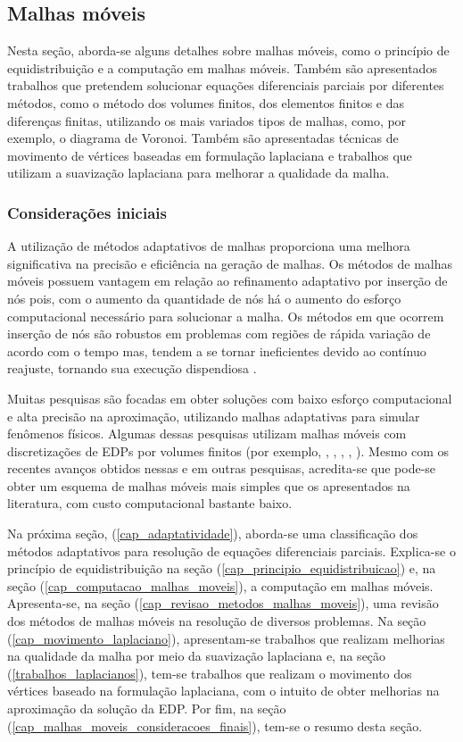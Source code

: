 \subsection{Malhas móveis}
\label{cap_malhas_moveis}
Nesta seção, aborda-se alguns detalhes sobre malhas móveis, como o princípio de equidistribuição e a computação em malhas móveis. Também são apresentados trabalhos que pretendem solucionar equações diferenciais parciais por diferentes métodos, como o método dos volumes finitos, dos elementos finitos e das diferenças finitas, utilizando os mais variados tipos de malhas, como, por exemplo, o diagrama de Voronoi. Também são apresentadas técnicas de movimento de vértices baseadas em formulação laplaciana e trabalhos que utilizam a suavização laplaciana para melhorar a qualidade da malha.

\subsubsection{Considerações iniciais}

A utilização de métodos adaptativos de malhas proporciona uma melhora significativa na precisão e eficiência na geração de malhas. Os métodos de malhas móveis possuem vantagem em relação ao refinamento adaptativo por inserção de nós pois, com o aumento da quantidade de nós há o aumento do esforço computacional necessário para solucionar a malha. Os métodos em que ocorrem inserção de nós são robustos em problemas com regiões de rápida variação de acordo com o tempo mas, tendem a se tornar ineficientes devido ao contínuo reajuste, tornando sua execução dispendiosa \cite[p. 709]{Huang1994A}. 

Muitas pesquisas são focadas em obter soluções com baixo esforço computacional e alta precisão na aproximação, utilizando malhas adaptativas para simular fenômenos físicos. Algumas dessas pesquisas utilizam malhas móveis com discretizações de EDPs por volumes finitos (por exemplo, , , , , ). Mesmo com os recentes avanços obtidos nessas e em outras pesquisas, acredita-se que pode-se obter um esquema de malhas móveis mais simples que os apresentados na literatura, com custo computacional bastante baixo.

Na próxima seção, (\ref{cap_adaptatividade}), aborda-se uma classificação dos métodos adaptativos para resolução de equações diferenciais parciais. Explica-se o princípio de equidistribuição na seção (\ref{cap_principio_equidistribuicao}) e, na seção (\ref{cap_computacao_malhas_moveis}), a computação em malhas móveis. Apresenta-se, na seção (\ref{cap_revisao_metodos_malhas_moveis}), uma revisão dos métodos de malhas móveis na resolução de diversos problemas. Na seção (\ref{cap_movimento_laplaciano}), apresentam-se trabalhos que realizam melhorias na qualidade da malha por meio da suavização laplaciana e, na seção (\ref{trabalhos_laplacianos}), tem-se trabalhos que realizam o movimento dos vértices baseado na formulação laplaciana, com o intuito de obter melhorias na aproximação da solução da EDP. Por fim, na seção (\ref{cap_malhas_moveis_consideracoes_finais}), tem-se o resumo desta seção.

